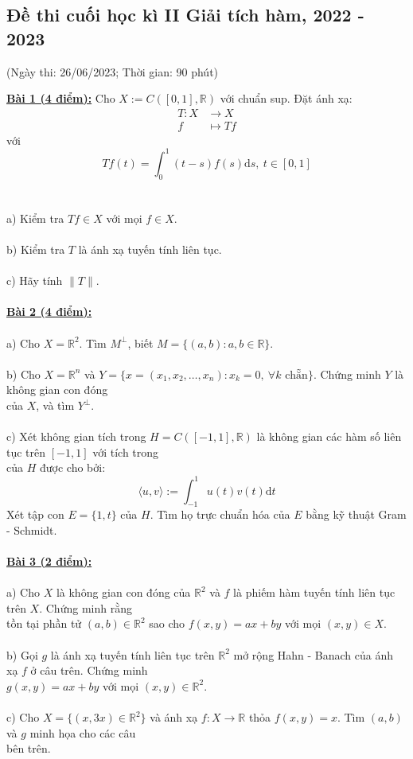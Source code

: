 \documentclass[10pt, a4paper]{article}
\begin{document}
\subsection{Đề thi cuối học kì II Giải tích hàm, 2022 - 2023}
\begin{center}
	\color{blue}(Ngày thi: 26/06/2023; Thời gian: 90 phút)
\end{center}
\color{red}\underline{\textbf{Bài 1 (4 điểm):}} \color{black}Cho $X:=C([0,1],\mathbb R)$ với chuẩn sup. Đặt ánh xạ:\begin{align*}
	T:X&\rightarrow X\\
	f&\mapsto Tf
\end{align*}
với $$Tf(t)=\displaystyle\int_0^1(t-s)f(s)\text{d}s,~t\in[0,1]$$\\\\
\color{red}a) \color{black}Kiểm tra $Tf\in X$ với mọi $f\in X$.\\\\
\color{red}b) \color{black}Kiểm tra $T$ là ánh xạ tuyến tính liên tục.\\\\
\color{red}c) \color{black}Hãy tính $\lVert T\rVert$.\\\\
\color{red}\underline{\textbf{Bài 2 (4 điểm):}}\\\\
\color{red}a) \color{black}Cho $X=\mathbb R^2$. Tìm $M^\perp$, biết $M=\{(a,b):a,b\in\mathbb R\}$.\\\\
\color{red}b) \color{black}Cho $X=\mathbb R^n$ và $Y=\{x=(x_1,x_2,\dots,x_n):x_k=0,~\forall k\text{ chẵn}\}$. Chứng minh $Y$ là không gian con đóng\\ của $X$, và tìm $Y^\perp$.\\\\
\color{red}c) \color{black}Xét không gian tích trong $H=C([-1,1],\mathbb R)$ là không gian các hàm số liên tục trên $[-1,1]$ với tích trong\\ của $H$ được cho bởi: $$\langle u,v\rangle:=\displaystyle\int_{-1}^1u(t)v(t)\text{d}t$$
Xét tập con $E=\{1,t\}$ của $H$. Tìm họ trực chuẩn hóa của $E$ bằng kỹ thuật Gram - Schmidt.\\\\
\color{red}\underline{\textbf{Bài 3 (2 điểm):}}\\\\
\color{red}a) \color{black}Cho $X$ là không gian con đóng của $\mathbb R^2$ và $f$ là phiếm hàm tuyến tính liên tục trên $X$. Chứng minh rằng \\ tồn tại phần tử $(a,b)\in\mathbb R^2$ sao cho $f(x,y)=ax+by$ với mọi $(x,y)\in X$.\\\\
\color{red}b) \color{black}Gọi $g$ là ánh xạ tuyến tính liên tục trên $\mathbb R^2$ mở rộng Hahn - Banach của ánh xạ $f$ ở câu trên. Chứng minh\\ $g(x,y)=ax+by$ với mọi $(x,y)\in\mathbb R^2$.\\\\
\color{red}c) \color{black}Cho $X=\{(x,3x)\in\mathbb R^2\}$ và ánh xạ $f:X\rightarrow\mathbb R$ thỏa $f(x,y)=x$. Tìm $(a,b)$ và $g$ minh họa cho các câu\\ bên trên.
\end{document}
